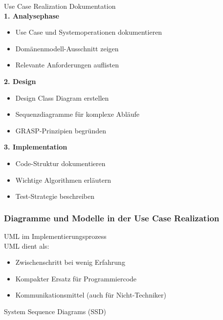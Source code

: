 \begin{corollary}{Use Case Realization Dokumentation}\\
\textbf{1. Analysephase}
\begin{itemize}
    \item Use Case und Systemoperationen dokumentieren
    \item Domänenmodell-Ausschnitt zeigen
    \item Relevante Anforderungen auflisten
\end{itemize}

\textbf{2. Design}
\begin{itemize}
    \item Design Class Diagram erstellen
    \item Sequenzdiagramme für komplexe Abläufe
    \item GRASP-Prinzipien begründen
\end{itemize}

\textbf{3. Implementation}
\begin{itemize}
    \item Code-Struktur dokumentieren
    \item Wichtige Algorithmen erläutern
    \item Test-Strategie beschreiben
\end{itemize}
\end{corollary}


\columnbreak

\subsubsection{Diagramme und Modelle in der Use Case Realization}

\begin{definition}{UML im Implementierungsprozess}\\
UML dient als:
\begin{itemize}
    \item Zwischenschritt bei wenig Erfahrung
    \item Kompakter Ersatz für Programmiercode
    \item Kommunikationsmittel (auch für Nicht-Techniker)
\end{itemize}
\end{definition}

\begin{concept}{System Sequence Diagrams (SSD)}
\end{concept}

